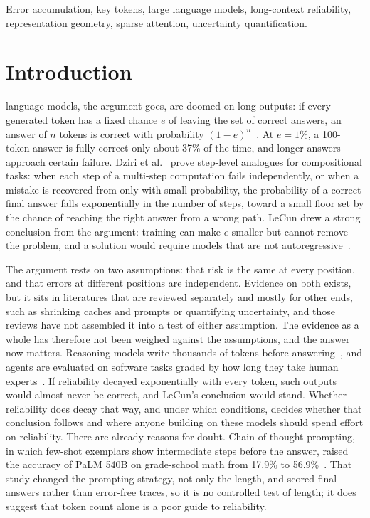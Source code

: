 \documentclass{ieeeaccess}
\begin{document}
\begin{keywords}
Error accumulation, key tokens, large language models, long-context reliability, representation geometry, sparse attention, uncertainty quantification.
\end{keywords}

\titlepgskip=-21pt

\maketitle

\section{Introduction}
\label{sec:intro}
 language models, the argument goes, are doomed on long outputs: if every generated token has a fixed chance $e$ of leaving the set of correct answers, an answer of $n$ tokens is correct with probability $(1-e)^n$~\cite{lecun2023why}. At $e = 1\%$, a 100-token answer is fully correct only about 37\% of the time, and longer answers approach certain failure. Dziri et al.~\cite{dziri2023faith} prove step-level analogues for compositional tasks: when each step of a multi-step computation fails independently, or when a mistake is recovered from only with small probability, the probability of a correct final answer falls exponentially in the number of steps, toward a small floor set by the chance of reaching the right answer from a wrong path. LeCun drew a strong conclusion from the argument: training can make $e$ smaller but cannot remove the problem, and a solution would require models that are not autoregressive~\cite{lecun2023why}.

The argument rests on two assumptions: that risk is the same at every position, and that errors at different positions are independent. Evidence on both exists, but it sits in literatures that are reviewed separately and mostly for other ends, such as shrinking caches and prompts or quantifying uncertainty, and those reviews have not assembled it into a test of either assumption. The evidence as a whole has therefore not been weighed against the assumptions, and the answer now matters. Reasoning models write thousands of tokens before answering~\cite{cai2025rkv}, and agents are evaluated on software tasks graded by how long they take human experts~\cite{kwa2025measuring}. If reliability decayed exponentially with every token, such outputs would almost never be correct, and LeCun's conclusion would stand. Whether reliability does decay that way, and under which conditions, decides whether that conclusion follows and where anyone building on these models should spend effort on reliability. There are already reasons for doubt. Chain-of-thought prompting, in which few-shot exemplars show intermediate steps before the answer, raised the accuracy of PaLM 540B on grade-school math from 17.9\% to 56.9\%~\cite{wei2022chain}. That study changed the prompting strategy, not only the length, and scored final answers rather than error-free traces, so it is no controlled test of length; it does suggest that token count alone is a poor guide to reliability.
\end{document}
